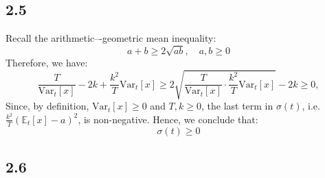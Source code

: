 \documentclass[11pt]{article}
\begin{document}
	\subsection*{2.5}
	
	Recall the arithmetic–-geometric mean inequality:
	\[
	a+b\geq2\sqrt{ab}, \quad a,b\geq 0
	\]
	Therefore, we have:
	\[
	\frac{T}{\mathrm{Var}_t[x]}-2k+\frac{k^2}{T}\mathrm{Var}_t[x]\geq 2\sqrt{\frac{T}{\mathrm{Var}_t[x]}\cdot \frac{k^2}{T}\mathrm{Var}_t[x]}-2k\geq 0,
	\]
	Since, by definition, $\mathrm{Var}_t[x]\geq 0$ and $T,k\geq 0$, the last term in $\sigma(t)$, i.e. $\frac{k^2}{T}(\mathbb{E}_t[x]-a)^2$, is non-negative. Hence, we conclude that:
	\[
	\boxed{
		\sigma(t)\geq 0
	}
	\]
	\subsection*{2.6}
	
\end{document}
